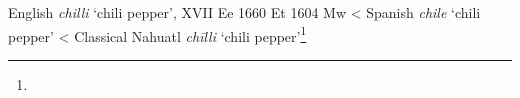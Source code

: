\begin{etymology}\label{ety:chili}
English \textit{chilli} `chili pepper', XVII Ee 1660 Et 1604 Mw
< Spanish \textit{chile} `chili pepper'
< Classical Nahuatl \textit{chīlli} `chili pepper'\footnote{}
\end{etymology}